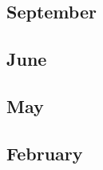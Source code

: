 \documentclass[12pt]{article}
\begin{document}
\subsection{September}
\begin{refsection}
    \nocite{muennighoff_olmoe_2025}
    \printbibliography[heading=none]
\end{refsection}

\subsection{June}
\begin{refsection}
    \nocite{penedo_fineweb_2024}
    \printbibliography[heading=none]
\end{refsection}


\subsection{May}
\begin{refsection}
    \nocite{grattafiori2024llama3herdmodels}
    \nocite{gu_mamba_2024}
    \printbibliography[heading=none]
\end{refsection}




\subsection{February}
\begin{refsection}
    \nocite{groeneveld_olmo_2024}
    \printbibliography[heading=none]
\end{refsection}
\end{document}
